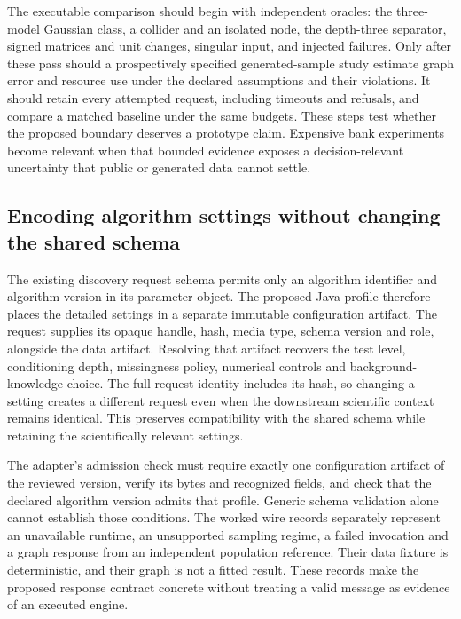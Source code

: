 The executable comparison should begin with independent oracles: the
three-model Gaussian class, a collider and an isolated node, the
depth-three separator, signed matrices and unit changes, singular input,
and injected failures. Only after these pass should a prospectively
specified generated-sample study estimate graph error and resource use
under the declared assumptions and their violations. It should retain
every attempted request, including timeouts and refusals, and compare a
matched baseline under the same budgets. These steps test whether the
proposed boundary deserves a prototype claim. Expensive bank experiments
become relevant when that bounded evidence exposes a decision-relevant
uncertainty that public or generated data cannot settle.
\label{exec13:java-adapter-end}

\hypertarget{encoding-algorithm-settings-without-changing-the-shared-schema}{%
\subsection{Encoding algorithm settings without changing the shared
schema}\label{encoding-algorithm-settings-without-changing-the-shared-schema}}

The existing discovery request schema permits only an algorithm
identifier and algorithm version in its parameter object. The proposed
Java profile therefore places the detailed settings in a separate
immutable configuration artifact. The request supplies its opaque
handle, hash, media type, schema version and role, alongside the data
artifact. Resolving that artifact recovers the test level, conditioning
depth, missingness policy, numerical controls and background-knowledge
choice. The full request identity includes its hash, so changing a
setting creates a different request even when the downstream scientific
context remains identical. This preserves compatibility with the shared
schema while retaining the scientifically relevant settings.
\citep{exec13_java_adapter_contract}

The adapter's admission check must require exactly one configuration
artifact of the reviewed version, verify its bytes and recognized
fields, and check that the declared algorithm version admits that
profile. Generic schema validation alone cannot establish those
conditions. The worked wire records separately represent an unavailable
runtime, an unsupported sampling regime, a failed invocation and a graph
response from an independent population reference. Their data fixture is
deterministic, and their graph is not a fitted result. These records
make the proposed response contract concrete without treating a valid
message as evidence of an executed engine. \label{exec13:java-wire-end}

